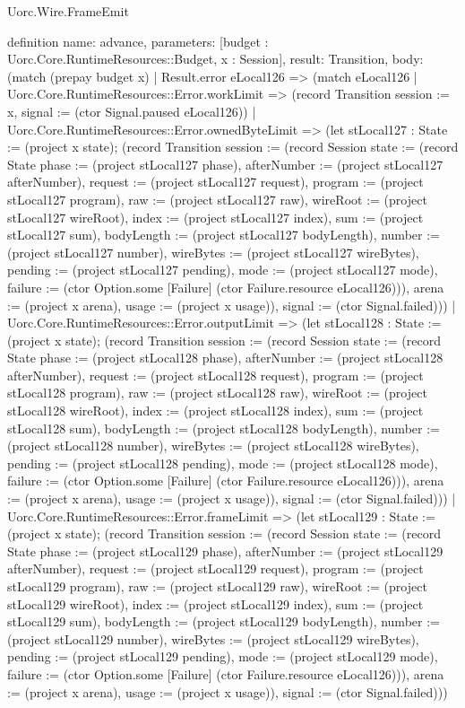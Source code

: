 \begin{lexlean}{Uorc.Wire.FrameEmit}
\begin{semanticmodule}
definition{
  name: advance,
  parameters: [budget : Uorc.Core.RuntimeResources::Budget, x : Session],
  result: Transition,
  body: (match (prepay budget x)
    | Result.error eLocal126 => (match eLocal126
      | Uorc.Core.RuntimeResources::Error.workLimit => (record Transition {session := x, signal := (ctor Signal.paused eLocal126)})
      | Uorc.Core.RuntimeResources::Error.ownedByteLimit => (let stLocal127 : State := (project x state); (record Transition {session := (record Session {state := (record State {phase := (project stLocal127 phase), afterNumber := (project stLocal127 afterNumber), request := (project stLocal127 request), program := (project stLocal127 program), raw := (project stLocal127 raw), wireRoot := (project stLocal127 wireRoot), index := (project stLocal127 index), sum := (project stLocal127 sum), bodyLength := (project stLocal127 bodyLength), number := (project stLocal127 number), wireBytes := (project stLocal127 wireBytes), pending := (project stLocal127 pending), mode := (project stLocal127 mode), failure := (ctor Option.some [Failure] (ctor Failure.resource eLocal126))}), arena := (project x arena), usage := (project x usage)}), signal := (ctor Signal.failed)}))
      | Uorc.Core.RuntimeResources::Error.outputLimit => (let stLocal128 : State := (project x state); (record Transition {session := (record Session {state := (record State {phase := (project stLocal128 phase), afterNumber := (project stLocal128 afterNumber), request := (project stLocal128 request), program := (project stLocal128 program), raw := (project stLocal128 raw), wireRoot := (project stLocal128 wireRoot), index := (project stLocal128 index), sum := (project stLocal128 sum), bodyLength := (project stLocal128 bodyLength), number := (project stLocal128 number), wireBytes := (project stLocal128 wireBytes), pending := (project stLocal128 pending), mode := (project stLocal128 mode), failure := (ctor Option.some [Failure] (ctor Failure.resource eLocal126))}), arena := (project x arena), usage := (project x usage)}), signal := (ctor Signal.failed)}))
      | Uorc.Core.RuntimeResources::Error.frameLimit => (let stLocal129 : State := (project x state); (record Transition {session := (record Session {state := (record State {phase := (project stLocal129 phase), afterNumber := (project stLocal129 afterNumber), request := (project stLocal129 request), program := (project stLocal129 program), raw := (project stLocal129 raw), wireRoot := (project stLocal129 wireRoot), index := (project stLocal129 index), sum := (project stLocal129 sum), bodyLength := (project stLocal129 bodyLength), number := (project stLocal129 number), wireBytes := (project stLocal129 wireBytes), pending := (project stLocal129 pending), mode := (project stLocal129 mode), failure := (ctor Option.some [Failure] (ctor Failure.resource eLocal126))}), arena := (project x arena), usage := (project x usage)}), signal := (ctor Signal.failed)}))
}
\end{semanticmodule}
\end{lexlean}
